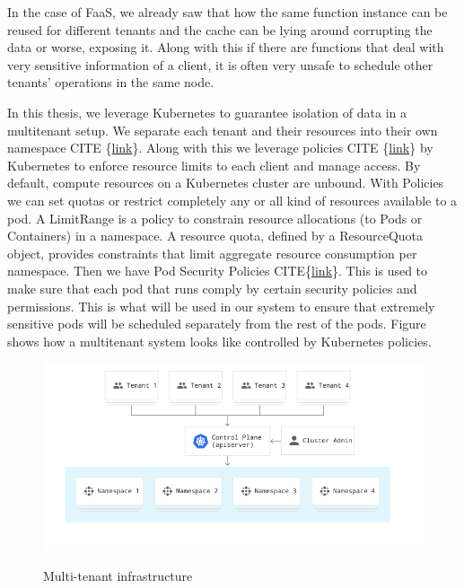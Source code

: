 \documentclass[12pt,titlepage]{article}
\begin{document}
In the case of FaaS, we already saw that how the same function instance can be
reused for different tenants and the cache can be lying around corrupting the
data or worse, exposing it. Along with this if there are functions that deal
with very sensitive information of a client, it is often very unsafe to schedule
other tenants' operations in the same node. 

In this thesis, we leverage Kubernetes to guarantee isolation of data in a
multitenant setup. We separate each tenant and their resources into their own
namespace CITE \{\href{https://kubernetes.io/docs/concepts/overview/working-with-objects/namespaces/}{link}\}. Along with this we leverage policies CITE \{\href{https://kubernetes.io/docs/concepts/policy/limit-range/}{link}\} by Kubernetes to enforce
resource limits to each client and manage access. By default, compute resources
on a Kubernetes cluster are unbound. With Policies we can set quotas or restrict
completely any or all kind of resources available to a pod. A LimitRange is a
policy to constrain resource allocations (to Pods or Containers) in a namespace.
A resource quota, defined by a ResourceQuota object, provides constraints that
limit aggregate resource consumption per namespace. Then we have Pod Security
Policies CITE\{\href{https://kubernetes.io/docs/concepts/policy/pod-security-policy/}{link}\}. This is used to make sure that each pod that runs comply by
certain security policies and permissions. This is what will be used in our
system to ensure that extremely sensitive pods will be scheduled separately
from the rest of the pods. Figure shows how a multitenant
system looks like controlled by Kubernetes policies.

\begin{figure}[!h]
    \caption{Multi-tenant infrastructure}
    \centering
    \includegraphics[width=130mm]{./thesis_images/multitenancy.png}
    \label{fig:multitenancy}
\end{figure}
\end{document}
